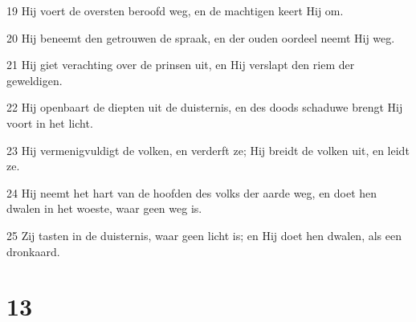 \par 19 Hij voert de oversten beroofd weg, en de machtigen keert Hij om.
\par 20 Hij beneemt den getrouwen de spraak, en der ouden oordeel neemt Hij weg.
\par 21 Hij giet verachting over de prinsen uit, en Hij verslapt den riem der geweldigen.
\par 22 Hij openbaart de diepten uit de duisternis, en des doods schaduwe brengt Hij voort in het licht.
\par 23 Hij vermenigvuldigt de volken, en verderft ze; Hij breidt de volken uit, en leidt ze.
\par 24 Hij neemt het hart van de hoofden des volks der aarde weg, en doet hen dwalen in het woeste, waar geen weg is.
\par 25 Zij tasten in de duisternis, waar geen licht is; en Hij doet hen dwalen, als een dronkaard.

\chapter{13}

